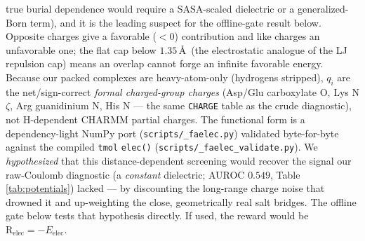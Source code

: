 \documentclass[11pt]{article}
\newcommand{\R}{\mathrm{R}}
\newcommand{\ttk}[1]{\texttt{\small #1}}
\begin{document}
true burial dependence would require a SASA-scaled dielectric or a generalized-Born term), and it is
the leading suspect for the offline-gate result below. Opposite charges give a favorable ($<0$)
contribution and like charges an unfavorable one; the flat cap below $1.35$\,\AA\ (the electrostatic
analogue of the LJ repulsion cap) means an overlap cannot forge an infinite favorable energy. Because
our packed complexes are heavy-atom-only (hydrogens stripped), $q_i$ are the net/sign-correct
\emph{formal charged-group charges} (Asp/Glu carboxylate O, Lys N$\zeta$, Arg guanidinium N, His N ---
the same \ttk{CHARGE} table as the crude diagnostic), not H-dependent CHARMM partial charges. The
functional form is a dependency-light NumPy port (\ttk{scripts/\_faelec.py}) validated byte-for-byte
against the compiled \ttk{tmol} \ttk{elec()} (\ttk{scripts/\_faelec\_validate.py}). We
\emph{hypothesized} that this distance-dependent screening would recover the signal our raw-Coulomb
diagnostic (a \emph{constant} dielectric; AUROC $0.549$, Table \ref{tab:potentials}) lacked --- by
discounting the long-range charge noise that drowned it and up-weighting the close, geometrically real
salt bridges. The offline gate below tests that hypothesis directly. If used, the reward would be
$\R_{\mathrm{elec}}=-E_{\mathrm{elec}}$.
\end{document}
